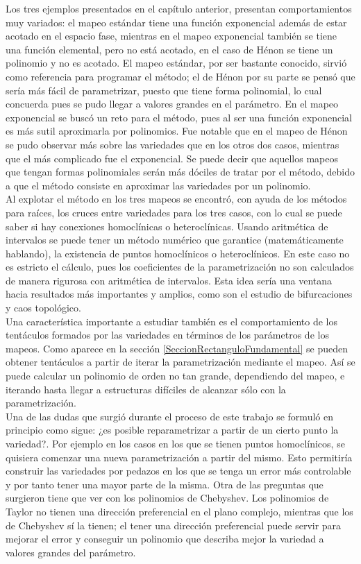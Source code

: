 Los tres ejemplos presentados en el capítulo anterior, presentan comportamientos muy variados: el mapeo estándar tiene una función exponencial además de estar acotado en el espacio fase, mientras en el mapeo exponencial también se tiene una función elemental, pero no está acotado, en el caso de Hénon se tiene un polinomio y no es acotado. El mapeo estándar, por ser bastante conocido, sirvió como referencia para programar el método; el de Hénon por su parte se pensó que sería más fácil de parametrizar, puesto que tiene forma polinomial, lo cual concuerda pues se pudo llegar a valores grandes en el parámetro. En el mapeo exponencial se buscó un reto para el método, pues al ser una función exponencial es más sutil aproximarla por polinomios. Fue notable que en el mapeo de Hénon se pudo observar más sobre las variedades que en los otros dos casos, mientras que el más complicado fue el exponencial. Se puede decir que aquellos mapeos que tengan formas polinomiales serán más dóciles de tratar por el método, debido a que el método consiste en aproximar las variedades por un polinomio.\\

Al explotar el método en los tres mapeos se encontró, con ayuda de los métodos para raíces, los cruces entre variedades para los tres casos, con lo cual se puede saber si hay conexiones homoclínicas o heteroclínicas. Usando aritmética de intervalos se puede tener un método numérico que garantice (matemáticamente hablando), la existencia de puntos homoclínicos o heteroclínicos. En este caso no es estricto el cálculo, pues los coeficientes de la parametrización no son calculados de manera rigurosa con aritmética de intervalos. Esta idea sería una ventana hacia resultados más importantes y amplios, como son el estudio de bifurcaciones y caos topológico.\\

Una característica importante a estudiar también es el comportamiento de los tentáculos formados por las variedades en términos de los parámetros de los mapeos. Como aparece en la sección \ref{SeccionRectanguloFundamental} se pueden obtener tentáculos a partir de iterar la parametrización mediante el mapeo. Así se puede calcular un polinomio de orden no tan grande, dependiendo del mapeo, e iterando hasta llegar a estructuras difíciles de alcanzar sólo con la parametrización.\\

Una de las dudas que surgió durante el proceso de este trabajo se formuló en principio como sigue: ¿es posible reparametrizar a partir de un cierto punto la variedad?. Por ejemplo en los casos en los que se tienen puntos homoclínicos, se quisiera comenzar una nueva parametrización a partir del mismo. Esto permitiría construir las variedades por pedazos en los que se tenga un error más controlable y por tanto tener una mayor parte de la misma. Otra de las preguntas que surgieron tiene que ver con los polinomios de Chebyshev. Los polinomios de Taylor no tienen una dirección preferencial en el plano complejo, mientras que los de Chebyshev sí la tienen; el tener una dirección preferencial puede servir para mejorar el error y conseguir un polinomio que describa mejor la variedad a valores grandes del parámetro. 
